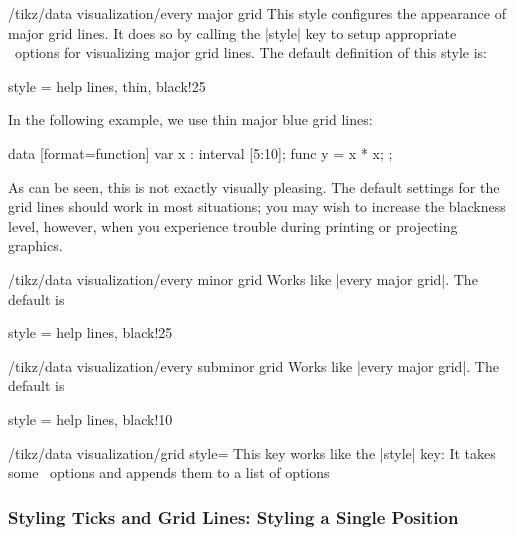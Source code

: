 \begin{stylekey}{/tikz/data visualization/every major grid}
  This style configures the appearance of major grid lines. It does so
  by calling the |style| key to setup appropriate \tikzname\ options
  for visualizing major grid lines. The default definition of this
  style is:
\begin{codeexample}
style = {help lines, thin, black!25}
\end{codeexample}
  In the following example, we use thin major blue grid lines:
\begin{codeexample}[]
\tikz \datavisualization
  [scientific axes,
   all axes={
     length=3cm,
     grid,
     grid={minor steps between steps}
   },
   every major grid/.style = {style={blue, thin}},
   visualize as line]
  data [format=function] {
    var x : interval [5:10];
    func y = \value x * \value x;
  };
\end{codeexample}   
  As can be seen, this is not exactly visually pleasing. The default
  settings for the grid lines should work in most situations; you may
  wish to increase the blackness level, however, when you experience
  trouble during printing or projecting graphics.
\end{stylekey}

\begin{stylekey}{/tikz/data visualization/every minor grid}
  Works like |every major grid|. The default is
\begin{codeexample}
style = {help lines, black!25}
\end{codeexample}
\end{stylekey}

\begin{stylekey}{/tikz/data visualization/every subminor grid}
  Works like |every major grid|. The default is
\begin{codeexample}
style = {help lines, black!10}
\end{codeexample}
\end{stylekey}

\begin{key}{/tikz/data visualization/grid style=}
  This key works like the |style| key: It takes some \tikzname\
  options and appends them to a list of options 
\end{key}


\subsubsection{Styling Ticks and Grid Lines: Styling a Single Position}

